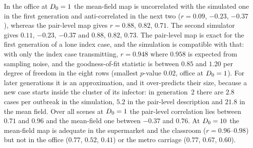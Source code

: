 In the office at $D_0=1$ the mean-field map is uncorrelated with the simulated one in the first generation and
anti-correlated in the next two ($r=0.09$, $-0.23$, $-0.37$), whereas the pair-level map gives $r=0.88$, $0.82$,
$0.71$. The second simulator gives $0.11$, $-0.23$, $-0.37$ and $0.88$, $0.82$, $0.73$.
The pair-level map is exact for the first generation of a lone index case, and the simulation is compatible with
that: with only the index case transmitting, $r=0.948$ where $0.958$ is expected from sampling noise, and the
goodness-of-fit statistic is between $0.85$ and $1.20$ per degree of freedom in the eight rows (smallest
$p$-value $0.02$, office at $D_0=1$).
For later generations it is an approximation, and it over-predicts their size, because a new case starts inside
the cluster of its infector: in generation~2 there are $2.8$ cases per outbreak in the simulation, $5.2$ in the
pair-level description and $21.8$ in the mean field.
Over all scenes at $D_0=1$ the pair-level correlation lies between $0.71$ and $0.96$ and the mean-field one between $-0.37$ and $0.76$.
At $D_0=10$ the mean-field map is adequate in the supermarket and the classroom ($r=0.96$--$0.98$) but not in
the office ($0.77$, $0.52$, $0.41$) or the metro carriage ($0.77$, $0.67$, $0.60$).

